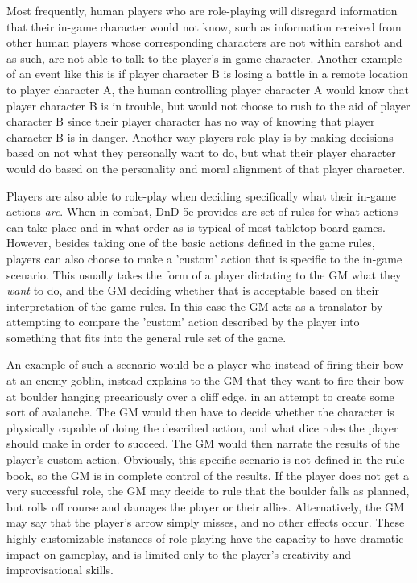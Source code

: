 \documentclass[12pt,a4paper]{report}
\begin{document}
		Most frequently, human players who are role-playing will disregard information that their in-game character would not know, such as information received from other human players whose corresponding characters are not within earshot and as such, are not able to talk to the player's in-game character. Another example of an event like this is if player character B is losing a battle in a remote location to player character A, the human controlling player character A would know that player character B is in trouble, but would not choose to rush to the aid of player character B since their player character has no way of knowing that player character B is in danger. Another way players role-play is by making decisions based on not what they personally want to do, but what their player character would do based on the personality and moral alignment of that player character.
		
		Players are also able to role-play when deciding specifically what their in-game actions \textit{are}. When in combat, DnD 5e provides are set of rules for what actions can take place and in what order as is typical of most tabletop board games. However, besides taking one of the basic actions defined in the game rules, players can also choose to make a 'custom' action that is specific to the in-game scenario. This usually takes the form of a player dictating to the GM what they \textit{want} to do, and the GM deciding whether that is acceptable based on their interpretation of the game rules. In this case the GM acts as a translator by attempting to compare the 'custom' action described by the player into something that fits into the general rule set of the game. 
		
		An example of such a scenario would be a player who instead of firing their bow at an enemy goblin, instead explains to the GM that they want to fire their bow at boulder hanging precariously over a cliff edge, in an attempt to create some sort of avalanche. The GM would then have to decide whether the character is physically capable of doing the described action, and what dice roles the player should make in order to succeed. The GM would then narrate the results of the player's custom action. Obviously, this specific scenario is not defined in the rule book, so the GM is in complete control of the results. If the player does not get a very successful role, the GM may decide to rule that the boulder falls as planned, but rolls off course and damages the player or their allies. Alternatively, the GM may say that the player's arrow simply misses, and no other effects occur. These highly customizable instances of role-playing have the capacity to have dramatic impact on gameplay, and is limited only to the player's creativity and improvisational skills. 
		
\end{document}
